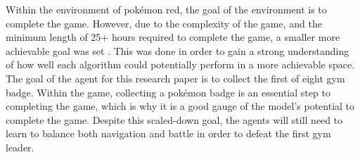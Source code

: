 Within the environment of pokémon red, the goal of the environment is to complete the game. However, due to the complexity of the game, and the minimum length of 25+ hours required to complete the game, a smaller more achievable goal was set \cite{howlongtobeat}. This was done in order to gain a strong understanding of how well each algorithm could potentially perform in a more achievable space. The goal of the agent for this research paper is to collect the first of eight gym badge. Within the game, collecting a pokémon badge is an essential step to completing the game, which is why it is a good gauge of the model's potential to complete the game. Despite this scaled-down goal, the agents will still need to learn to balance both navigation and battle in order to defeat the first gym leader.